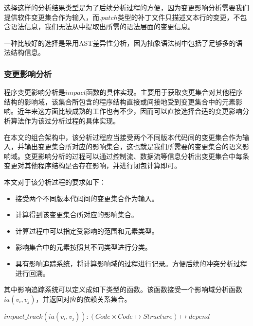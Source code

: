 选择这样的分析结果类型是为了后续分析过程的方便，因为变更影响分析需要我们提供软件变更集合作为输入，而$.patch$类型的补丁文件只描述文本行的变更，不包含语法信息，我们无法从中提取出所需的语法层面的变更信息。

一种比较好的选择是采用AST差异性分析，因为抽象语法树中包括了足够多的语法结构信息。






\subsubsection{变更影响分析}

程序变更影响分析是$impact$函数的具体实现。主要用于获取变更集合对其他程序结构的影响域，该集合所包含的程序结构直接或间接地受到变更集合中的元素影响。近年来这方面比较成熟的工作也有不少，因而可以直接选择合适的变更影响分析算法作为该过分析过程的具体实现。

在本文的组合架构中，该分析过程应当接受两个不同版本代码间的变更集合作为输入，并输出变更集合所对应的影响集合，这也就是我们所需要的变更集合的语义影响域。变更影响分析的过程可以通过控制流、数据流等信息分析出变更集合中每条变更对其他程序结构是否存在影响，并进行闭包计算即可。

本文对于该分析过程的要求如下：
\begin{itemize}
	\item 接受两个不同版本代码间的变更集合作为输入。
	\item 计算得到该变更集合所对应的影响集合。
	\item 计算过程中可以指定受影响的范围和元素类型。
	\item 影响集合中的元素按照其不同类型进行分类。
	\item 具有影响追踪系统，将计算影响域的过程进行记录。方便后续的冲突分析过程进行回溯。
\end{itemize}

其中影响追踪系统可以定义成如下类型的函数。该函数接受一个影响域分析函数$ia(v_i,v_j)$，并返回对应的依赖关系集合。

\begin{definition}
	$impact\_track(ia(v_i,v_j)):(Code \times Code \mapsto {Structure}) \mapsto {depend}$
\end{definition}



